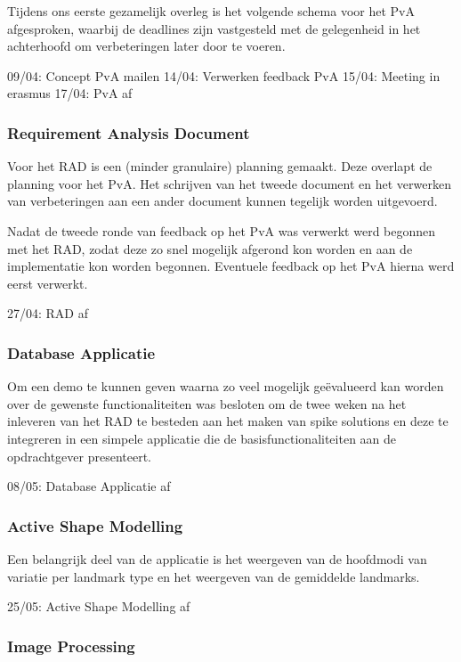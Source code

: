 Tijdens ons eerste gezamelijk overleg is het volgende schema voor het PvA
afgesproken, waarbij de deadlines zijn vastgesteld met de gelegenheid in het achterhoofd om 
verbeteringen later door te voeren.

09/04: Concept PvA mailen
14/04: Verwerken feedback PvA
15/04: Meeting in erasmus
17/04: PvA af

\subsubsection{Requirement Analysis Document}

Voor het RAD is een (minder granulaire) planning gemaakt. Deze overlapt
de planning voor het PvA. Het schrijven van het tweede document en
het verwerken van verbeteringen aan een ander document kunnen tegelijk worden
uitgevoerd.

Nadat de tweede ronde van feedback op het PvA was verwerkt werd begonnen met
het RAD, zodat deze zo snel mogelijk afgerond kon worden en aan de
implementatie kon worden begonnen. Eventuele feedback op het PvA hierna werd
eerst verwerkt.

27/04: RAD af

\subsubsection{Database Applicatie}

Om een demo te kunnen geven waarna zo veel mogelijk ge\"{e}valueerd kan worden
over de gewenste functionaliteiten was besloten om de twee weken na het
inleveren van het RAD te besteden aan het maken van spike solutions en deze te
integreren in een simpele applicatie die de basisfunctionaliteiten aan de
opdrachtgever presenteert.

08/05: Database Applicatie af

\subsubsection{Active Shape Modelling}

Een belangrijk deel van de applicatie is het weergeven van de hoofdmodi van
variatie per landmark type en het weergeven van de gemiddelde landmarks.

25/05: Active Shape Modelling af

\subsubsection{Image Processing}

